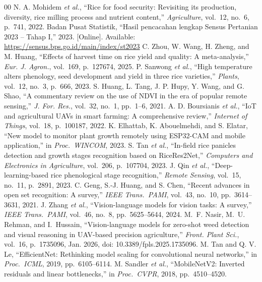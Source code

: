\documentclass[conference]{IEEEtran}
\begin{document}
\begin{thebibliography}{00}
 N. A. Mohidem \textit{et al.}, ``Rice for food security: Revisiting its production, diversity, rice milling process and nutrient content,'' \textit{Agriculture}, vol.~12, no.~6, p.~741, 2022.
 Badan Pusat Statistik, ``Hasil pencacahan lengkap Sensus Pertanian 2023 -- Tahap I,'' 2023. [Online]. Available: \url{https://sensus.bps.go.id/main/index/st2023}
 C. Zhou, W. Wang, H. Zheng, and M. Huang, ``Effects of harvest time on rice yield and quality: A meta-analysis,'' \textit{Eur. J. Agron.}, vol.~169, p.~127674, 2025.
 P. Sanwong \textit{et al.}, ``High temperature alters phenology, seed development and yield in three rice varieties,'' \textit{Plants}, vol.~12, no.~3, p.~666, 2023.
 S. Huang, L. Tang, J. P. Hupy, Y. Wang, and G. Shao, ``A commentary review on the use of NDVI in the era of popular remote sensing,'' \textit{J. For. Res.}, vol.~32, no.~1, pp.~1--6, 2021.
 A. D. Boursianis \textit{et al.}, ``IoT and agricultural UAVs in smart farming: A comprehensive review,'' \textit{Internet of Things}, vol.~18, p.~100187, 2022.
 K. Elhattab, K. Abouelmehdi, and S. Elatar, ``New model to monitor plant growth remotely using ESP32-CAM and mobile application,'' in \textit{Proc.\ WINCOM}, 2023.
 S. Tan \textit{et al.}, ``In-field rice panicles detection and growth stages recognition based on RiceRes2Net,'' \textit{Computers and Electronics in Agriculture}, vol.~206, p.~107704, 2023.
 J. Qin \textit{et al.}, ``Deep-learning-based rice phenological stage recognition,'' \textit{Remote Sensing}, vol.~15, no.~11, p.~2891, 2023.
 C. Geng, S.-J. Huang, and S. Chen, ``Recent advances in open set recognition: A survey,'' \textit{IEEE Trans.\ PAMI}, vol.~43, no.~10, pp.~3614--3631, 2021.
 J. Zhang \textit{et al.}, ``Vision-language models for vision tasks: A survey,'' \textit{IEEE Trans.\ PAMI}, vol.~46, no.~8, pp.~5625--5644, 2024.
 M.~F. Nasir, M.~U. Rehman, and I.~Hussain, ``Vision-language models for zero-shot weed detection and visual reasoning in {UAV}-based precision agriculture,'' \textit{Front. Plant Sci.}, vol.~16, p.~1735096, Jan. 2026, doi: 10.3389/fpls.2025.1735096.
 M. Tan and Q. V. Le, ``EfficientNet: Rethinking model scaling for convolutional neural networks,'' in \textit{Proc.\ ICML}, 2019, pp.~6105--6114.
 M. Sandler \textit{et al.}, ``MobileNetV2: Inverted residuals and linear bottlenecks,'' in \textit{Proc.\ CVPR}, 2018, pp.~4510--4520.

\end{thebibliography}
\end{document}
